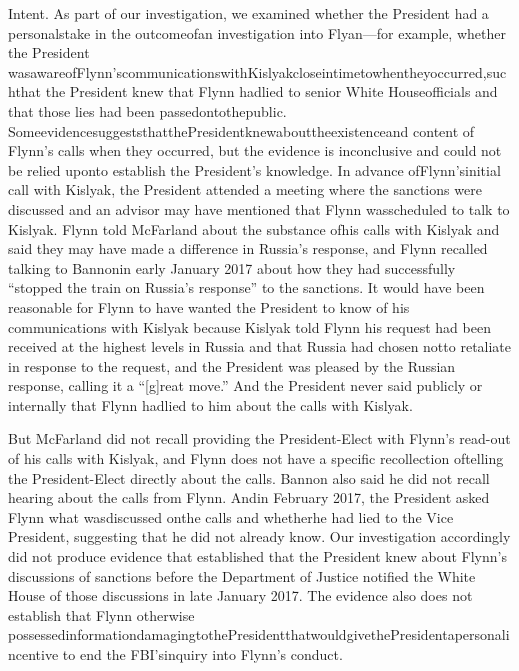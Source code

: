 Intent.
As part of our investigation, we examined whether the President had a personalstake in the outcomeofan investigation into Flyan—for example, whether the President wasawareofFlynn’scommunicationswithKislyakcloseintimetowhentheyoccurred,suchthat the President knew that Flynn hadlied to senior White Houseofficials and that those lies had been passedontothepublic.
SomeevidencesuggeststhatthePresidentknewabouttheexistenceand content of Flynn’s calls when they occurred, but the evidence is inconclusive and could not be relied uponto establish the President’s knowledge.
In advance ofFlynn’sinitial call with Kislyak, the President attended a meeting where the sanctions were discussed and an advisor may have mentioned that Flynn wasscheduled to talk to Kislyak.
Flynn told McFarland about the substance ofhis calls with Kislyak and said they may have made a difference in Russia’s response, and Flynn recalled talking to Bannonin early January 2017 about how they had successfully “stopped the train on Russia’s response” to the sanctions.
It would have been reasonable for Flynn to have wanted the President to know of his communications with Kislyak because Kislyak told Flynn his request had been received at the highest levels in Russia and that Russia had chosen notto retaliate in response to the request, and the President was pleased by the Russian response, calling it a “[g]reat move.”
And the President never said publicly or internally that Flynn hadlied to him about the calls with Kislyak.

But McFarland did not recall providing the President-Elect with Flynn’s read-out of his calls with Kislyak, and Flynn does not have a specific recollection oftelling the President-Elect directly about the calls.
Bannon also said he did not recall hearing about the calls from Flynn.
Andin February 2017, the President asked Flynn what wasdiscussed onthe calls and whetherhe had lied to the Vice President, suggesting that he did not already know.
Our investigation accordingly did not produce evidence that established that the President knew about Flynn’s discussions of sanctions before the Department of Justice notified the White House of those discussions in late January 2017.
The evidence also does not establish that Flynn otherwise possessedinformationdamagingtothePresidentthatwouldgivethePresidentapersonalincentive to end the FBI’sinquiry into Flynn’s conduct.

